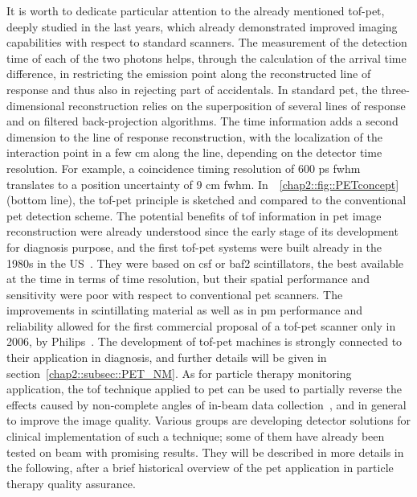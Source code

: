 It is worth to dedicate particular attention to the already mentioned \gls{tof}-\gls{pet}, deeply studied in the last years, which already demonstrated improved imaging capabilities with respect to standard scanners. The measurement of the detection time of each of the two photons helps, through the calculation of the arrival time difference, in restricting the emission point along the reconstructed line of response and thus also in rejecting part of accidentals. In standard \gls{pet}, the three-dimensional reconstruction relies on the superposition of several lines of response and on filtered back-projection algorithms. The time information adds a second dimension to the line of response reconstruction, with the localization of the interaction point in a few cm along the line, depending on the detector time resolution. For example, a coincidence timing resolution of 600 ps \gls{fwhm} translates to a position uncertainty of 9 cm \gls{fwhm}. In~\figurename~\ref{chap2::fig::PETconcept} (bottom line), the \gls{tof}-\gls{pet} principle is sketched and compared to the conventional \gls{pet} detection scheme. 
The potential benefits of \gls{tof} information in \gls{pet} image reconstruction were already understood since the early stage of its development for diagnosis purpose, and the first \gls{tof}-\gls{pet} systems were built already in the 1980s in the US~\parencite{Gariod1982}. They were based on \gls{csf} or \gls{baf2} scintillators, the best available at the time in terms of time resolution, but their spatial performance and sensitivity were poor with respect to conventional \gls{pet} scanners. The improvements in scintillating material as well as in \gls{pm} performance and reliability allowed for the first commercial proposal of a \gls{tof}-\gls{pet} scanner only in 2006, by Philips~\parencite{Surti2007}. The development of \gls{tof}-\gls{pet} machines is strongly connected to their application in diagnosis, and further details will be given in section~\ref{chap2::subsec::PET_NM}. As for particle therapy monitoring application, the \gls{tof} technique applied to \gls{pet} can be used to partially reverse the effects caused by non-complete angles of in-beam data collection~\parencite{Crespo2006}, and in general to improve the image quality. Various groups are developing detector solutions for clinical implementation of such a technique; some of them have already been tested on beam with promising results. They will be described in more details in the following, after a brief historical overview of the \gls{pet} application in particle therapy quality assurance. 

